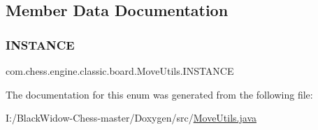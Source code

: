 \subsection{Member Data Documentation}
\mbox{\label{enumcom_1_1chess_1_1engine_1_1classic_1_1board_1_1_move_utils_af8aad7f4a2fa99e792337918fcfb8c2c}} 
\subsubsection{\texorpdfstring{INSTANCE}{INSTANCE}}
{\footnotesize\ttfamily com.\+chess.\+engine.\+classic.\+board.\+Move\+Utils.\+I\+N\+S\+T\+A\+N\+CE}



The documentation for this enum was generated from the following file\+:\begin{DoxyCompactItemize}
\item 
I\+:/\+Black\+Widow-\/\+Chess-\/master/\+Doxygen/src/\mbox{\hyperlink{_move_utils_8java}{Move\+Utils.\+java}}\end{DoxyCompactItemize}
